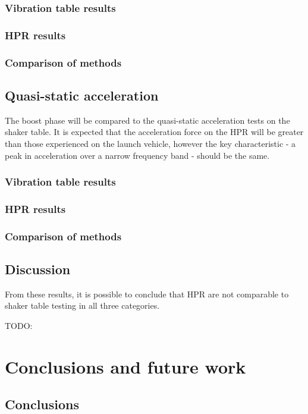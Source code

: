 \documentclass[]{report}
\begin{document}
\subsection{Vibration table results}
\subsection{HPR results}
\subsection{Comparison of methods}

\section{Quasi-static acceleration}
The boost phase will be compared to the quasi-static acceleration tests on the shaker table. It is expected that the acceleration force on the HPR will be greater than those experienced on the launch vehicle, however the key characteristic - a peak in acceleration over a narrow frequency band - should be the same.
\subsection{Vibration table results}
\subsection{HPR results}
\subsection{Comparison of methods}

\section{Discussion}

From these results, it is possible to conclude that HPR are not comparable to shaker table testing in all three categories.

TODO:

\chapter{Conclusions and future work}

\section{Conclusions}
\end{document}
